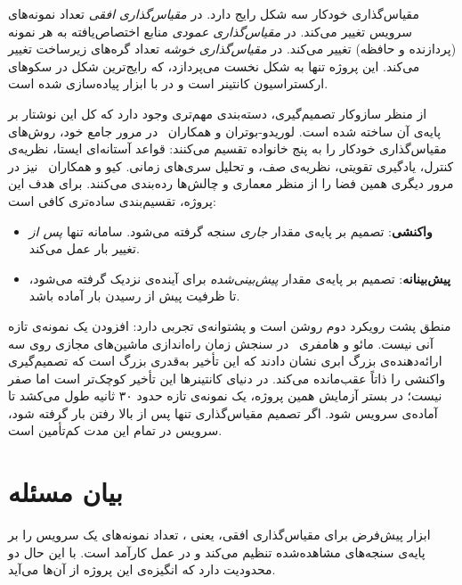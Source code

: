 مقیاس‌گذاری خودکار سه شکل رایج دارد. در \emph{مقیاس‌گذاری افقی}
تعداد نمونه‌های سرویس تغییر می‌کند. در \emph{مقیاس‌گذاری عمودی}
منابع اختصاص‌یافته به هر نمونه (پردازنده و حافظه) تغییر می‌کند. در \emph{مقیاس‌گذاری خوشه}
تعداد گره‌های زیرساخت تغییر می‌کند. این پروژه تنها به شکل نخست می‌پردازد، که رایج‌ترین شکل در
سکوهای ارکستراسیون کانتینر است و در  با ابزار
 پیاده‌سازی شده است.

از منظر سازوکار تصمیم‌گیری، دسته‌بندی مهم‌تری وجود دارد که کل این نوشتار بر پایه‌ی آن ساخته
شده است. لوریدو-بوتران و همکاران~\cite{lorido2014} در مرور جامع خود، روش‌های مقیاس‌گذاری
خودکار را به پنج خانواده تقسیم می‌کنند: قواعد آستانه‌ای ایستا، نظریه‌ی کنترل، یادگیری تقویتی،
نظریه‌ی صف، و تحلیل سری‌های زمانی. کیو و همکاران~\cite{qu2018} نیز در مرور دیگری همین فضا را
از منظر معماری و چالش‌ها رده‌بندی می‌کنند. برای هدف این پروژه، تقسیم‌بندی ساده‌تری کافی است:

\begin{itemize}
  \item \textbf{واکنشی}: تصمیم بر پایه‌ی مقدار \emph{جاری} سنجه گرفته
  می‌شود. سامانه تنها \emph{پس از} تغییر بار عمل می‌کند.
  \item \textbf{پیش‌بینانه}: تصمیم بر پایه‌ی مقدار
  \emph{پیش‌بینی‌شده} برای آینده‌ی نزدیک گرفته می‌شود، تا ظرفیت پیش از رسیدن بار آماده باشد.
\end{itemize}

منطق پشت رویکرد دوم روشن است و پشتوانه‌ی تجربی دارد: افزودن یک نمونه‌ی تازه آنی نیست. مائو و
هامفری~\cite{mao2012} در سنجش زمان راه‌اندازی ماشین‌های مجازی روی سه ارائه‌دهنده‌ی بزرگ ابری
نشان دادند که این تأخیر به‌قدری بزرگ است که تصمیم‌گیری واکنشی را ذاتاً عقب‌مانده می‌کند. در
دنیای کانتینرها این تأخیر کوچک‌تر است اما صفر نیست؛ در بستر آزمایش همین پروژه، یک نمونه‌ی
تازه حدود ۳۰ ثانیه طول می‌کشد تا آماده‌ی سرویس شود. اگر تصمیم مقیاس‌گذاری تنها پس از بالا رفتن
بار گرفته شود، سرویس در تمام این مدت کم‌تأمین است.

\section{بیان مسئله}
\label{sec:intro-problem}

ابزار پیش‌فرض  برای مقیاس‌گذاری افقی، یعنی ، تعداد نمونه‌های یک سرویس
را بر پایه‌ی سنجه‌های مشاهده‌شده تنظیم می‌کند و در عمل کارآمد است. با این حال دو محدودیت دارد
که انگیزه‌ی این پروژه از آن‌ها می‌آید.

